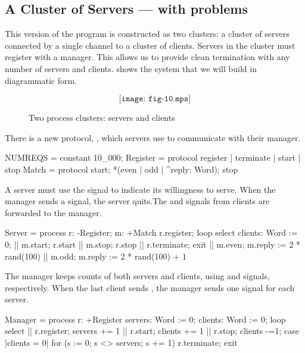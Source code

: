 \subsection{A Cluster of Servers --- with problems}

This version of the program is constructed as two clusters: a cluster of servers connected by a single channel to a cluster of clients.  Servers in the cluster must register with a manager.  This allows us to provide clean termination with any number of servers and clients.   shows the system that we will build in diagrammatic form.

\begin{figure}[htbp]
$$\texttt{[image: fig-10.mps]}$$
\caption{Two process clusters: servers and clients}
\label{fig-clus}
\end{figure}

There is a new protocol, , which servers use to communicate with their manager.
\begin{code}
NUMREQS = constant 10_000;
Register = protocol { register | terminate | start | stop }
Match = protocol { start; *(even | odd | ^reply: Word); stop }
\end{code}

A server must use the signal  to indicate its willingness to serve.  When the manager sends a  signal, the server quits.The  and  signals from clients are forwarded to the manager.
\begin{code}
Server = process r: -Register; m: +Match 
{
  r.register;
  loop select 
    clients: Word := 0;
  {
    || m.start; r.start
    || m.stop; r.stop
    || r.terminate; exit
    || m.even; m.reply := 2 * rand(100)
    || m.odd; m.reply := 2 * rand(100) + 1
  }
}
\end{code}

The manager keeps counts of both servers and clients, using  and  signals, respectively.  When the last client sends , the manager sends one  signal for each server.
\begin{code}
Manager = process r: +Register
{
  servers: Word := 0;
  clients: Word := 0;
  loop select
  {
    || r.register; servers += 1
    || r.start; clients += 1
    || r.stop; clients -=1;
       case
       {
         |clients = 0|
            for (s := 0; s <> servers; s += 1)
              r.terminate;
            exit
       }
  }
}
\end{code}

